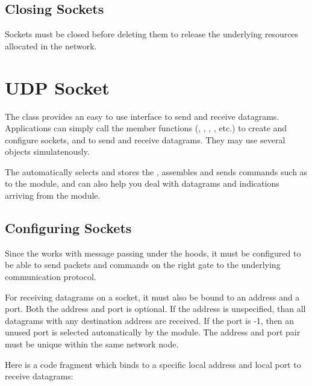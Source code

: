\subsection*{Closing Sockets}

Sockets must be closed before deleting them to release the underlying resources
allocated in the network.


\section{UDP Socket}

The  class provides an easy to use interface to send and
receive  datagrams. Applications can simply call the member
functions (, , , , etc.) to
create and configure sockets, and to send and receive  datagrams.
They may use several  objects simulatenously.

The  automatically selects and stores the ,
assembles and sends commands such as  to the 
module, and can also help you deal with datagrams and indications arriving from
the  module.

\subsection*{Configuring Sockets}

Since the  works with message passing under the hoods, it
must be configured to be able to send packets and commands on the right gate to
the underlying communication protocol.


For receiving  datagrams on a socket, it must also be bound to an
address and a port. Both the address and port is optional. If the address is
unspecified, than all  datagrams with any destination address are
received. If the port is -1, then an unused port is selected automatically by
the  module. The address and port pair must be unique within the
same network node.

Here is a code fragment which binds to a specific local address and local port
to receive  datagrams:

